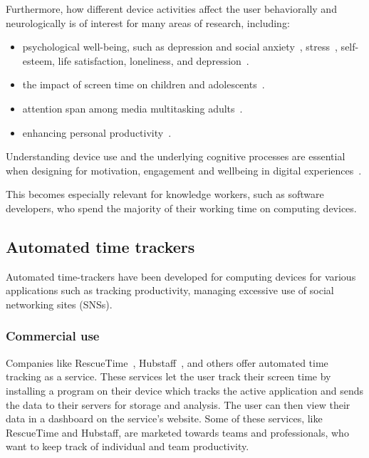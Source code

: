 \documentclass{IEEEtran}
\begin{document}
\begin{refsection}
Furthermore, how different device activities affect the user behaviorally and neurologically is of interest for many areas of research, including:

\begin{itemize}
    \item psychological well-being, such as depression and social anxiety~\cite{selfhout_different_2009}\cite{shah_nonrecursive_2002}, stress~\cite{mark_stress_2014}, self-esteem, life satisfaction, loneliness, and depression~\cite{huang_time_2017}.
    \item the impact of screen time on children and adolescents~\cite{subrahmanyam_impact_2001}.
    \item attention span among media multitasking adults~\cite{mark_stress_2014}.
    \item enhancing personal productivity~\cite{kim_timeaware_2016}.
\end{itemize}

Understanding device use and the underlying cognitive processes are essential when designing for motivation, engagement and wellbeing in digital experiences~\cite{peters_designing_2018}.

This becomes especially relevant for knowledge workers, such as software developers, who spend the majority of their working time on computing devices.


\subsection{Automated time trackers}

Automated time-trackers have been developed for computing devices for various applications such as tracking productivity, managing excessive use of social networking sites (SNSs).

\subsubsection{Commercial use}

Companies like RescueTime~\cite{noauthor_rescuetime_nodate}, Hubstaff~\cite{noauthor_hubstaff_nodate}, and others offer automated time tracking as a service. These services let the user track their screen time by installing a program on their device which tracks the active application and sends the data to their servers for storage and analysis. The user can then view their data in a dashboard on the service's website. Some of these services, like RescueTime and Hubstaff, are marketed towards teams and professionals, who want to keep track of individual and team productivity.


\end{refsection}
\end{document}
